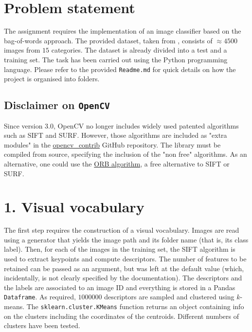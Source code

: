 \documentclass[12pt]{article}
\begin{document}
	
	\maketitle

  \section*{Problem statement}

  The assignment requires the implementation of an image classifier based on the bag-of-words approach. The provided dataset, taken from \cite{lazebnik2006beyond}, consists of \( \approx 4500 \) images from \( 15 \) categories. The dataset is already divided into a test and a training set. The task has been carried out using the Python programming language. Please refer to the provided \texttt{Readme.md} for quick details on how the project is organised into folders.


  \subsection*{Disclaimer on \texttt{OpenCV}}

  Since version 3.0, OpenCV no longer includes widely used patented algorithms such as SIFT and SURF. However, those algorithms are included as "extra modules" in the \href{https://github.com/opencv/opencv_contrib}{opencv\_contrib} GitHub repository. The library must be compiled from source, specifying the inclusion of the "non free" algorithms. As an alternative, one could use the \href{https://opencv-python-tutroals.readthedocs.io/en/latest/py_tutorials/py_feature2d/py_orb/py_orb.html}{ORB algorithm}, a free alternative to SIFT or SURF.



  \section*{1. Visual vocabulary}
  
  The first step requires the construction of a visual vocabulary. Images are read using a generator that yields the image path and its folder name (that is, its class label). Then, for each of the images in the training set, the SIFT algorithm is used to extract keypoints and compute descriptors. The number of features to be retained can be passed as an argument, but was left at the default value (which, incidentally, is not clearly specified by the documentation). The descriptors and the labels are associated to an image ID and everything is stored in a Pandas \texttt{Dataframe}. As required, \( 1000000 \) descriptors are sampled and clustered using \( k \)-means. The \texttt{sklearn.cluster.KMeans} function returns an object containing info on the clusters including the coordinates of the centroids. Different numbers of clusters have been tested.
  
\end{document}
